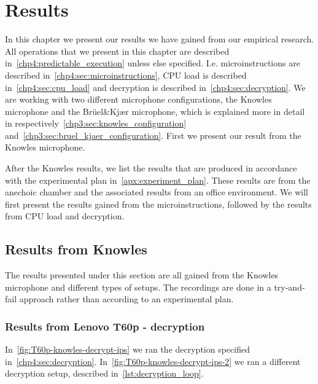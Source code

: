\chapter{Results}
\label{chp5:results} 
In this chapter we present our results we have gained from our empirical research. 
All operations that we present in this chapter are described in~\autoref{chp4:predictable_execution} unless else specified. 
I.e. microinstructions are described in~\autoref{chp4:sec:microinstructions}, CPU load is described in~\autoref{chp4:sec:cpu_load} and decryption is described in~\autoref{chp4:sec:decryption}. 
We are working with two different microphone configurations, the Knowles microphone and the Brüel\&Kjær microphone, which is explained more in detail in respectively~\autoref{chp3:sec:knowles_configuration} and~\autoref{chp3:sec:bruel_kjaer_configuration}.
First we present our result from the Knowles microphone.

After the Knowles results, we list the results that are produced in accordance with the experimental plan in~\autoref{apx:experiment_plan}. 
These results are from the anechoic chamber and the associated results from an office environment.  
We will first present the results gained from the microinstructions, followed by the results from CPU load and decryption. 

\section{Results from Knowles}\label{chp5:sec:knowles_results}
The results presented under this section are all gained from the Knowles microphone and different types of setups.
The recordings are done in a try-and-fail approach rather than according to an experimental plan. 

\subsection{Results from Lenovo T60p - decryption}\label{chp5:subsec:t60p_knowles_results_decryption}
In~\autoref{fig:T60p-knowles-decrypt-ips} we ran the decryption specified in~\autoref{chp4:sec:decryption}. 
In~\autoref{fig:T60p-knowles-decrypt-ips-2} we ran a different decryption setup, described in~\autoref{lst:decryption_loop}.

